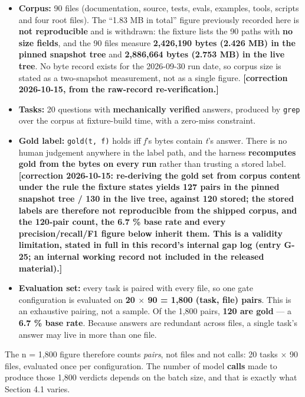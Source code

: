 \documentclass[11pt,a4paper]{article}
\begin{document}
\begin{itemize}
\item \textbf{Corpus:} 90 files (documentation, source, tests, evals, examples, tools, scripts and four root files). The ``1.83 MB in total'' figure previously recorded here is \textbf{not reproducible} and is withdrawn: the fixture lists the 90 paths with \textbf{no size fields}, and the 90 files measure \textbf{2,426,190 bytes (2.426 MB) in the pinned snapshot tree} and \textbf{2,886,664 bytes (2.753 MB) in the live tree}. No byte record exists for the 2026-09-30 run date, so corpus size is stated as a two-snapshot measurement, not as a single figure. \textbf{[correction 2026-10-15, from the raw-record re-verification.]}
\item \textbf{Tasks:} 20 questions with \textbf{mechanically verified} answers, produced by \texttt{grep} over the corpus at fixture-build time, with a zero-miss constraint.
\item \textbf{Gold label:} \texttt{gold(t, f)} holds iff \emph{f}'s bytes contain \emph{t}'s answer. There is no human judgement anywhere in the label path, and the harness \textbf{recomputes gold from the bytes on every run} rather than trusting a stored label. \textbf{[correction 2026-10-15: re-deriving the gold set from corpus content under the rule the fixture states yields 127 pairs in the pinned snapshot tree / 130 in the live tree, against 120 stored; the stored labels are therefore not reproducible from the shipped corpus, and the 120-pair count, the 6.7 \% base rate and every precision/recall/F1 figure below inherit them. This is a validity limitation, stated in full in this record's internal gap log (entry G-25; an internal working record not included in the released material).]}
\item \textbf{Evaluation set:} every task is paired with every file, so one gate configuration is evaluated on \textbf{20 $\times$ 90 = 1,800 (task, file) pairs}. This is an exhaustive pairing, not a sample. Of the 1,800 pairs, \textbf{120 are gold} --- a \textbf{6.7 \% base rate}. Because answers are redundant across files, a single task's answer may live in more than one file.
\end{itemize}

The n = 1,800 figure therefore counts \emph{pairs}, not files and not calls: 20 tasks $\times$ 90 files, evaluated once per configuration. The number of model \textbf{calls} made to produce those 1,800 verdicts depends on the batch size, and that is exactly what Section 4.1 varies.
\end{document}
